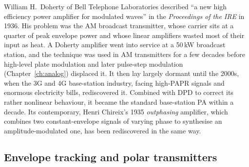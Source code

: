 
\begin{history}
William H.\ Doherty of Bell Telephone Laboratories described ``a new high efficiency power amplifier for
modulated waves'' in the \emph{Proceedings of the IRE} in 1936. His problem was the AM broadcast
transmitter, whose carrier sits at a quarter of peak envelope power and whose linear amplifiers wasted
most of their input as heat. A Doherty amplifier went into service at a 50\,kW broadcast station, and the
technique was used in AM transmitters for a few decades before high-level plate modulation and later
pulse-step modulation (Chapter~\ref{ch:analog}) displaced it. It then lay largely dormant until the
2000s, when the 3G and 4G base-station industry, facing high-PAPR signals and enormous electricity bills,
rediscovered it. Combined with DPD to correct its rather nonlinear behaviour, it became the standard
base-station PA within a decade. Its contemporary, Henri Chireix's 1935 \emph{outphasing} amplifier,
which combines two constant-envelope signals of varying phase to synthesise an amplitude-modulated one,
has been rediscovered in the same way.
\end{history}


\subsection{Envelope tracking and polar transmitters}

